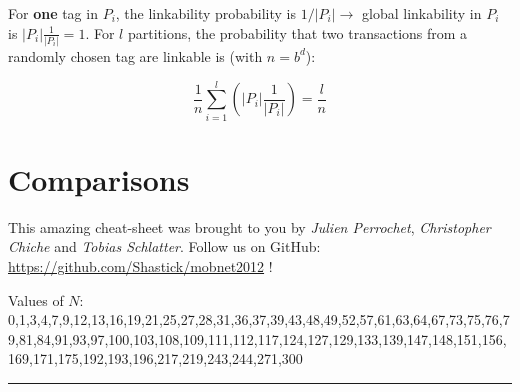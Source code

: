 \documentclass[6pt]{scrartcl}
\begin{document}
\begin{multicols}{4}
For \textbf{one} tag in $P_i$, the linkability probability is  $1/|P_i| \rightarrow$ global linkability in $P_i$ is $|P_i|\frac1{|P_i|} = 1$. For $l$ partitions, the probability that two transactions from a randomly chosen tag are linkable is (with $n = b^d$):

\begin{equation*}
\frac1n\sum_{i=1}^l(|P_i|\frac1{|P_i|}) = \frac ln
\end{equation*}

\section{Comparisons}

\begin{center}
This amazing cheat-sheet was brought to you by \emph{Julien Perrochet}, \emph{Christopher Chiche} and \emph{Tobias Schlatter}. Follow us on GitHub: \url{https://github.com/Shastick/mobnet2012} !
\end{center}
\end{multicols}

\begin{center}
\vspace{-10pt}
Values of $N$: 0,1,3,4,7,9,12,13,16,19,21,25,27,28,31,36,37,39,43,48,49,52,57,61,63,64,67,73,75,76,79,81,84,91,93,97,100,103,108,109,111,112,117,124,127,129,133,139,147,148,151,156,169,171,175,192,193,196,217,219,243,244,271,300



\end{center}
\vspace{-5pt}
\hrule
\vspace{-10pt}

\end{document}
